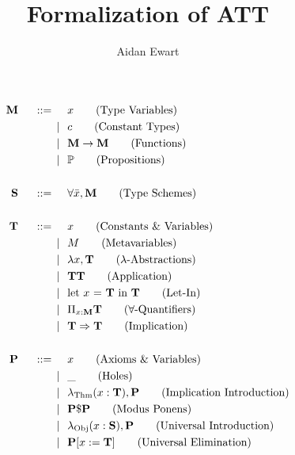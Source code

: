 \documentclass{article}
\author{Aidan Ewart}
\title{Formalization of ATT}
\newcommand{\prop}{\mathbb{P}}
\newcommand{\bnfdef}{\hspace{0.5cm} ::= \hspace{0.5cm}}
\newcommand{\alt}{\hspace{0.25cm} | \hspace{0.25cm}}
\newcommand{\bb}{\mathbf}
\begin{document}
\begin{align*}
    \bb{M} \bnfdef&
        x
        \tag{Type Variables}
    \\\alt&
        c
        \tag{Constant Types}
    \\\alt&
        \bb{M} \to \bb{M}
        \tag{Functions}
    \\\alt&
        \prop
        \tag{Propositions}
    \\\\\bb{S} \bnfdef&
        \forall{\bar{x}}, \bb{M}
        \tag{Type Schemes}
    \\\\\bb{T} \bnfdef&
        x
        \tag{Constants \& Variables}
    \\\alt&
        M
        \tag{Metavariables}
    \\\alt&
        \lambda x, \bb{T}
        \tag{$\lambda$-Abstractions}
    \\\alt&
        \bb{T} \bb{T}
        \tag{Application}
    \\\alt&
        \text{let $x$ = $\bb{T}$ in $\bb{T}$}
        \tag{Let-In}
    \\\alt&
        \Pi_{x : \bb{M}} \bb{T}
        \tag{$\forall$-Quantifiers}
    \\\alt&
        \bb{T} \Rightarrow \bb{T}
        \tag{Implication}
    \\\\\bb{P} \bnfdef&
        x
        \tag{Axioms \& Variables}
    \\\alt&
        \_
        \tag{Holes}
    \\\alt&
        \lambda_{\mathrm{Thm}} (x : \bb{T}), \bb{P}
        \tag{Implication Introduction}
    \\\alt&
        \bb{P} \$ \bb{P}
        \tag{Modus Ponens}
    \\\alt&
        \lambda_{\mathrm{Obj}} (x : \bb{S}), \bb{P}
        \tag{Universal Introduction}
    \\\alt&
        \bb{P}[x := \bb{T}]
        \tag{Universal Elimination}
\end{align*}
\end{document}
